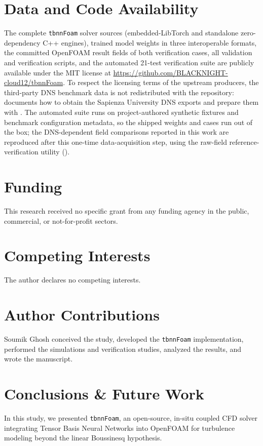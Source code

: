 \documentclass[11pt,a4paper]{article}
\begin{document}
\section*{Data and Code Availability}
The complete \texttt{tbnnFoam} solver sources (embedded-LibTorch and standalone zero-dependency C++ engines), trained model weights in three interoperable formats, the committed OpenFOAM result fields of both verification cases, all validation and verification scripts, and the automated 21-test verification suite are publicly available under the MIT license at \url{https://github.com/BLACKNIGHT-cloud12/tbnnFoam}. To respect the licensing terms of the upstream producers, the third-party DNS benchmark data is not redistributed with the repository:  documents how to obtain the Sapienza University DNS exports and prepare them with . The automated suite runs on project-authored synthetic fixtures and benchmark configuration metadata, so the shipped weights and cases run out of the box; the DNS-dependent field comparisons reported in this work are reproduced after this one-time data-acquisition step, using the raw-field reference-verification utility ().

\section*{Funding}
This research received no specific grant from any funding agency in the public, commercial, or not-for-profit sectors.

\section*{Competing Interests}
The author declares no competing interests.

\section*{Author Contributions}
Soumik Ghosh conceived the study, developed the \texttt{tbnnFoam} implementation, performed the simulations and verification studies, analyzed the results, and wrote the manuscript.

\section{Conclusions \& Future Work}

In this study, we presented \texttt{tbnnFoam}, an open-source, in-situ coupled CFD solver integrating Tensor Basis Neural Networks into OpenFOAM for turbulence modeling beyond the linear Boussinesq hypothesis.
\end{document}
